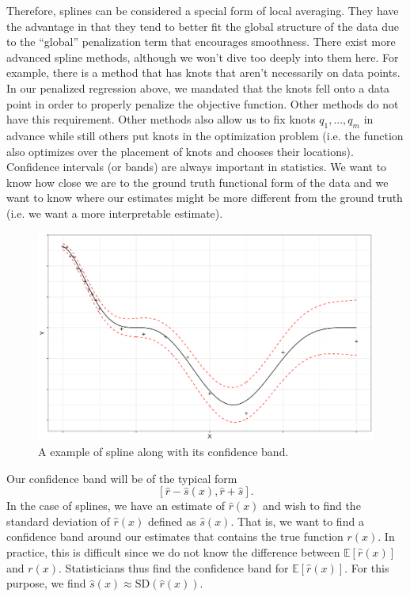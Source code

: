 Therefore, splines can be considered a special form of local averaging. They have the advantage in that they tend to better fit the global structure of the data due to the ``global'' penalization term that encourages smoothness.
There exist more advanced spline methods, although we won't dive too deeply into them here. For example, there is a method that has knots that aren't necessarily on data points. In our penalized regression above, we mandated that the knots fell onto a data point in order to properly penalize the objective function. Other methods do not have this requirement. Other methods also allow us to fix knots $q_1, ..., q_m$ in advance while still others put knots in the optimization problem (i.e. the function also optimizes over the placement of knots and chooses their locations).
Confidence intervals (or bands) are always important in statistics. We want to know how close we are to the ground truth functional form of the data and we want to know where our estimates might be more different from the ground truth (i.e. we want a more interpretable estimate).
\begin{figure}[htbp!]
	\centering
    \includegraphics[scale = .4]{figure/Lecture04/graph.png}
    \caption{A example of spline along with its confidence band.}
\end{figure}
Our confidence band will be of the typical form
$$
[\hat{r} - \hat{s}(x), \hat{r} + \hat{s}].
$$
In the case of splines, we have an estimate of $\hat{r}(x)$ and wish to find the standard deviation of $\hat{r}(x)$ defined as $\hat{s}(x)$. That is, we want to find a confidence band around our estimates that contains the true function $r(x)$. In practice, this is difficult since we do not know the difference between $\mathbb{E}[\hat{r}(x)]$ and $r(x)$. Statisticians thus find the confidence band for $\mathbb{E}[\hat{r}(x)]$. For this purpose, we find $\hat{s}(x) \approx \text{SD}(\hat{r}(x))$. 

